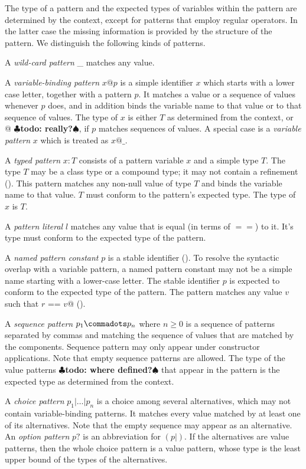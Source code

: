 \documentclass[11pt]{report}
\renewcommand{\todo}[1]{{$\clubsuit$\bf todo: #1$\spadesuit$}}
\begin{document}
The type of a pattern and the expected types of variables within the
pattern are determined by the context, except for patterns
that employ regular operators. In the latter case  the missing 
information is provided by the structure of the pattern. 
We distinguish the following kinds of patterns.

A {\em wild-card pattern} \_ matches any value. 

A {\em variable-binding pattern} $x @ p$ is a simple identifier $x$
which starts with a lower case letter, together with a pattern $p$. It
matches a value or a sequence of values whenever $p$ does, and in
addition binds the variable name to that value or to that sequence of
values. The type of $x$ is either $T$ as determined from the context, or
\verb@List[T]@ \todo{really?}, if $p$ matches sequences of values. A
special case is a {\em variable pattern} $x$ which is treated as $x @ \_$. 

A {\em typed pattern} $x: T$ consists of a pattern variable $x$ and a
simple type $T$. The type $T$ may be a class type or a compound type;
it may not contain a refinement ().  This
pattern matches any non-null value of type $T$ and binds the variable
name to that value.  $T$ must conform to the pattern's expected
type. The type of $x$ is $T$.

A {\em pattern literal} $l$ matches any value that is equal (in terms
of $==$) to it. It's type must conform to the expected type of the
pattern.

A {\em named pattern constant} $p$ is a stable identifier
(). To resolve the syntactic overlap with a
variable pattern, a named pattern constant may not be a simple name
starting with a lower-case letter. The stable identifier $p$ is
expected to conform to the expected type of the pattern. The pattern
matches any value $v$ such that \verb@$r$ == $v$@
().

A {\em sequence pattern} $p_1 \commadots p_n$ where $n \geq 0$ is a
sequence of patterns separated by commas and matching the sequence of
values that are matched by the components. Sequence pattern may only
appear under constructor applications. Note that empty sequence
patterns are allowed. The type of the value patterns \todo{where defined?}
that appear in
the pattern is the expected type as determined from the context.

A {\em choice pattern} $p_1 | \ldots | p_n$ is a choice among several
alternatives, which may not contain variable-binding patterns. It
matches every value matched by at least one of its alternatives. Note
that the empty sequence may appear as an alternative.  An {\em option
pattern} $p?$ is an abbreviation for $(p| )$. If the alternatives
are value patterns, then the whole choice pattern is a value pattern,
whose type is the least upper bound of the types of the alternatives.
\end{document}

